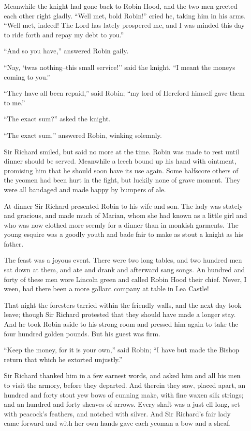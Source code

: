Meanwhile the knight had gone back to Robin Hood, and the two men
greeted each other right gladly. ``Well met, bold Robin!'' cried he,
taking him in his arms. ``Well met, indeed! The Lord has lately
prospered me, and I was minded this day to ride forth and repay my debt
to you.''

``And so you have,'' answered Robin gaily.

``Nay, `twas nothing--this small service!'' said the knight. ``I meant
the moneys coming to you.''

``They have all been repaid,'' said Robin; ``my lord of Hereford himself
gave them to me.''

``The exact sum?'' asked the knight.

``The exact sum,'' answered Robin, winking solemnly.

Sir Richard smiled, but said no more at the time. Robin was made to rest
until dinner should be served. Meanwhile a leech bound up his hand with
ointment, promising him that he should soon have its use again. Some
halfscore others of the yeomen had been hurt in the fight, but luckily
none of grave moment. They were all bandaged and made happy by bumpers
of ale.

At dinner Sir Richard presented Robin to his wife and son. The lady was
stately and gracious, and made much of Marian, whom she had known as a
little girl and who was now clothed more seemly for a dinner than in
monkish garments. The young esquire was a goodly youth and bade fair to
make as stout a knight as his father.

The feast was a joyous event. There were two long tables, and two
hundred men sat down at them, and ate and drank and afterward sang
songs. An hundred and forty of these men wore Lincoln green and called
Robin Hood their chief. Never, I ween, had there been a more gallant
company at table in Lea Castle!

That night the foresters tarried within the friendly walls, and the next
day took leave; though Sir Richard protested that they should have made
a longer stay. And he took Robin aside to his strong room and pressed
him again to take the four hundred golden pounds. But his guest was
firm.

``Keep the money, for it is your own,'' said Robin; ``I have but made
the Bishop return that which he extorted unjustly.''

Sir Richard thanked him in a few earnest words, and asked him and all
his men to visit the armory, before they departed. And therein they saw,
placed apart, an hundred and forty stout yew bows of cunning make, with
fine waxen silk strings; and an hundred and forty sheaves of arrows.
Every shaft was a just ell long, set with peacock's feathers, and
notched with silver. And Sir Richard's fair lady came forward and with
her own hands gave each yeoman a bow and a sheaf.

